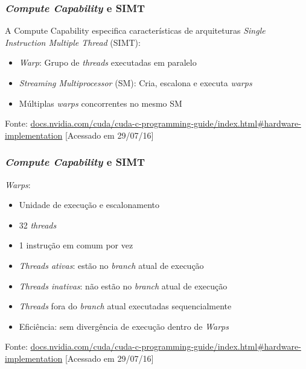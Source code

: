 \documentclass[10pt, compress]{beamer}
\begin{document}
\begin{frame}
    \frametitle{\textit{Compute Capability} e SIMT}
    A \alert{Compute Capability} especifica características de
    arquiteturas \textit{Single Instruction Multiple Thread} (SIMT):
    \pause
    \begin{itemize}
        \item \textit{Warp}: Grupo de \textit{threads} executadas em \alert{paralelo}
        \item \textit{Streaming Multiprocessor} (SM): Cria, escalona e executa \textit{warps}
            \pause
        \item Múltiplas \textit{warps} \alert{concorrentes} no mesmo SM
    \end{itemize}
    \vfill

    \begin{center}
        \tiny{Fonte: \url{docs.nvidia.com/cuda/cuda-c-programming-guide/index.html\#hardware-implementation} [Acessado em 29/07/16]}
    \end{center}
\end{frame}

\begin{frame}
    \frametitle{\textit{Compute Capability} e SIMT}
    \textit{Warps}:
    \pause
    \begin{itemize}
        \item Unidade de execução e escalonamento
        \item 32 \textit{threads}
            \pause
        \item 1 \alert{instrução em comum} por vez
            \pause
        \item \textit{Threads ativas}: estão no \textit{branch} atual de
            execução
        \item \textit{Threads inativas}: \alert{não} estão no \textit{branch}
            atual de execução
            \pause
        \item \textit{Threads} fora do \textit{branch} atual executadas
            \alert{sequencialmente}
            \pause
        \item Eficiência: sem divergência de execução dentro de \textit{Warps}
    \end{itemize}
    \vfill

    \begin{center}
        \tiny{Fonte: \url{docs.nvidia.com/cuda/cuda-c-programming-guide/index.html\#hardware-implementation} [Acessado em 29/07/16]}
    \end{center}
\end{frame}
\end{document}
